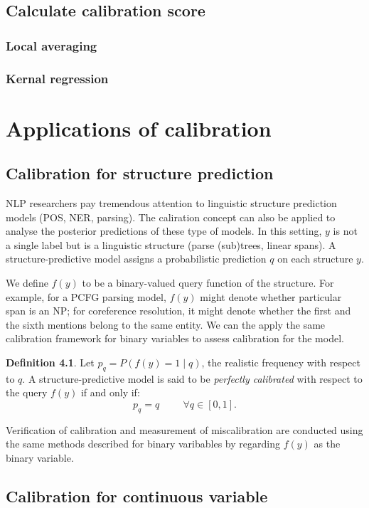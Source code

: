 \subsection{Calculate calibration score}
\subsubsection{Local averaging}

\subsubsection{Kernal regression}

\section{Applications of calibration}

\subsection{Calibration for structure prediction}

NLP researchers pay tremendous attention to linguistic structure prediction models (POS, NER, parsing). The caliration concept can also be applied to analyse the posterior predictions of these type of models. In this setting, $y$ is not a single label but is a linguistic structure (parse (sub)trees, linear spans). A structure-predictive model assigns a probabilistic prediction $q$ on each structure $y$. 

We define $f(y)$ to be a binary-valued query function of the structure. For example, for a PCFG parsing model, $f(y)$ might denote whether particular span is an NP; for coreference resolution, it might denote whether the first and the sixth mentions belong to the same entity. We can the apply the same calibration framework for binary variables to assess calibration for the model. 

\textbf{Definition 4.1}. Let $p_q = P(f(y) = 1 \mid q)$, the realistic frequency with respect to $q$. A structure-predictive model is said to be \textit{perfectly calibrated} with respect to the query $f(y)$ if and only if:
$$p_q = q \hspace{1cm} \forall q \in [0, 1].$$  

Verification of calibration and measurement of miscalibration are conducted using the same methods described for binary varibables by regarding $f(y)$ as the binary variable. 

\subsection{Calibration for continuous variable}


